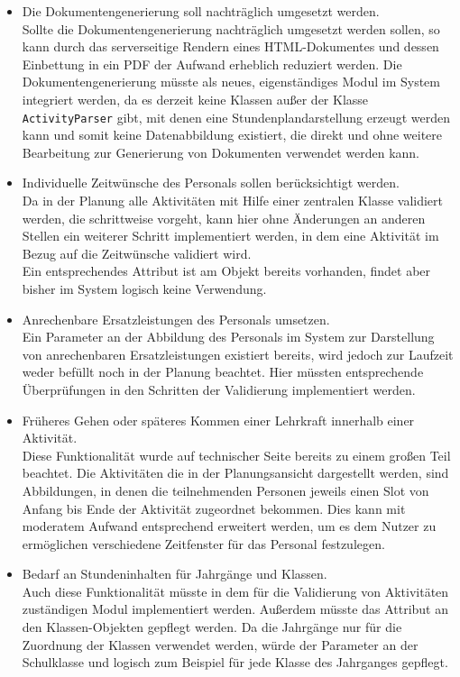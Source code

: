 \documentclass[fontsize=12pt,paper=a4,twoside]{scrartcl}
\begin{document}
\begin{itemize}
\item Die Dokumentengenerierung soll nachträglich umgesetzt werden. \\
Sollte die Dokumentengenerierung nachträglich umgesetzt werden sollen, so kann durch das serverseitige Rendern eines HTML-Dokumentes und dessen Einbettung in ein PDF der Aufwand erheblich reduziert werden. Die Dokumentengenerierung müsste als neues, eigenständiges Modul im System integriert werden, da es derzeit keine Klassen außer der Klasse \texttt{ActivityParser} gibt, mit denen eine Stundenplandarstellung erzeugt werden kann und somit keine Datenabbildung existiert, die direkt und ohne weitere  Bearbeitung zur Generierung von Dokumenten verwendet werden kann.\\

\item Individuelle Zeitwünsche des Personals sollen berücksichtigt werden.\\
Da in der Planung alle Aktivitäten mit Hilfe einer zentralen Klasse validiert werden, die schrittweise vorgeht, kann hier ohne Änderungen an anderen Stellen ein weiterer Schritt implementiert werden, in dem eine Aktivität im Bezug auf die Zeitwünsche validiert wird.\\
Ein entsprechendes Attribut ist am Objekt bereits vorhanden, findet aber bisher im System logisch keine Verwendung.\\

\item Anrechenbare Ersatzleistungen des Personals umsetzen.\\
Ein Parameter an der Abbildung des Personals im System zur Darstellung von anrechenbaren Ersatzleistungen existiert bereits, wird jedoch zur Laufzeit weder befüllt noch in der Planung beachtet. Hier müssten entsprechende Überprüfungen in den Schritten der Validierung implementiert werden.\\

\item Früheres Gehen oder späteres Kommen einer Lehrkraft innerhalb einer Aktivität.\\
Diese Funktionalität wurde auf technischer Seite bereits zu einem großen Teil beachtet. Die Aktivitäten die in der Planungsansicht dargestellt werden, sind Abbildungen, in denen die teilnehmenden Personen jeweils einen Slot von Anfang bis Ende der Aktivität zugeordnet bekommen. Dies kann mit moderatem Aufwand entsprechend erweitert werden, um es dem Nutzer zu ermöglichen verschiedene Zeitfenster für das Personal festzulegen.\\

\item Bedarf an Stundeninhalten für Jahrgänge und Klassen.\\
Auch diese Funktionalität müsste in dem für die Validierung von Aktivitäten zuständigen Modul implementiert werden. Außerdem müsste das Attribut an den Klassen-Objekten gepflegt werden. Da die Jahrgänge nur für die Zuordnung der Klassen verwendet werden, würde der Parameter an der Schulklasse und logisch zum Beispiel für jede Klasse des Jahrganges gepflegt.\\
\end{itemize}
\end{document}
